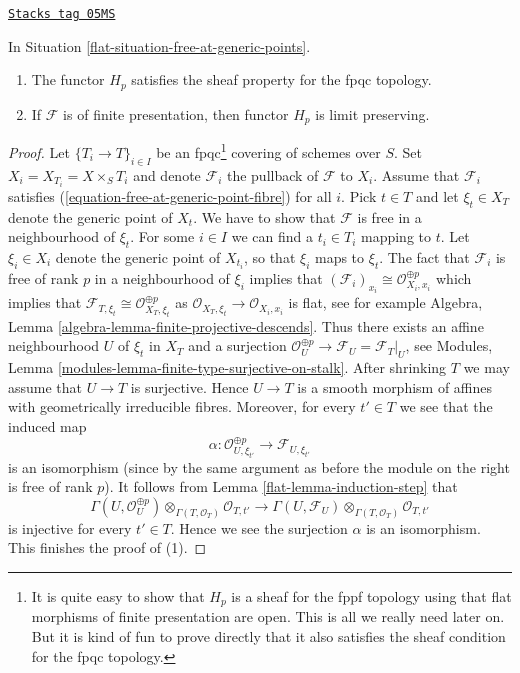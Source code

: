 \begin{lemma}
\label{flat-lemma-free-at-generic-points}
\href{https://stacks.math.columbia.edu/tag/05MS}{\texttt{Stacks tag 05MS}}

In Situation \ref{flat-situation-free-at-generic-points}.
\begin{enumerate}
\item The functor $H_p$ satisfies the sheaf property for the fpqc topology.
\item If $\mathcal{F}$ is of finite presentation, then functor $H_p$ is
limit preserving.
\end{enumerate}
\end{lemma}

\begin{proof}

Let $\{T_i \to T\}_{i \in I}$ be an fpqc\footnote{It is quite easy to
show that $H_p$
is a sheaf for the fppf topology using that flat morphisms of finite
presentation are open. This is all we really need later on. But it is kind
of fun to prove directly that it also satisfies the sheaf condition
for the fpqc topology.} covering of schemes over $S$.
Set $X_i = X_{T_i} = X \times_S T_i$ and denote $\mathcal{F}_i$ the
pullback of $\mathcal{F}$ to $X_i$. Assume that $\mathcal{F}_i$ satisfies
(\ref{equation-free-at-generic-point-fibre}) for all $i$.
Pick $t \in T$ and let $\xi_t \in X_T$ denote the generic point of $X_t$.
We have to show that $\mathcal{F}$ is free in a neighbourhood of $\xi_t$.
For some $i \in I$ we can find a $t_i \in T_i$ mapping to $t$.
Let $\xi_i \in X_i$ denote the generic point of $X_{t_i}$, so that
$\xi_i$ maps to $\xi_t$. The fact that $\mathcal{F}_i$ is free of rank
$p$ in a neighbourhood of $\xi_i$ implies that
$(\mathcal{F}_i)_{x_i} \cong \mathcal{O}_{X_i, x_i}^{\oplus p}$
which implies that
$\mathcal{F}_{T, \xi_t} \cong \mathcal{O}_{X_T, \xi_t}^{\oplus p}$
as $\mathcal{O}_{X_T, \xi_t} \to \mathcal{O}_{X_i, x_i}$ is flat, see
for example
Algebra, Lemma \ref{algebra-lemma-finite-projective-descends}.
Thus there exists an affine neighbourhood $U$ of $\xi_t$ in $X_T$
and a surjection
$\mathcal{O}_U^{\oplus p} \to \mathcal{F}_U = \mathcal{F}_T|_U$, see
Modules, Lemma \ref{modules-lemma-finite-type-surjective-on-stalk}.
After shrinking $T$ we may assume that $U \to T$ is surjective. Hence
$U \to T$ is a smooth morphism of affines with geometrically irreducible
fibres. Moreover, for every $t' \in T$ we see that the induced map
$$
\alpha :
\mathcal{O}_{U, \xi_{t'}}^{\oplus p}
\longrightarrow
\mathcal{F}_{U, \xi_{t'}}
$$
is an isomorphism (since by the same argument as before the module on the right
is free of rank $p$). It follows from
Lemma \ref{flat-lemma-induction-step}
that
$$
\Gamma(U, \mathcal{O}_U^{\oplus p})
\otimes_{\Gamma(T, \mathcal{O}_T)} \mathcal{O}_{T, t'}
\longrightarrow
\Gamma(U, \mathcal{F}_U)
\otimes_{\Gamma(T, \mathcal{O}_T)} \mathcal{O}_{T, t'}
$$
is injective for every $t' \in T$. Hence we see the surjection $\alpha$ is an
isomorphism. This finishes the proof of (1).


\end{proof}
